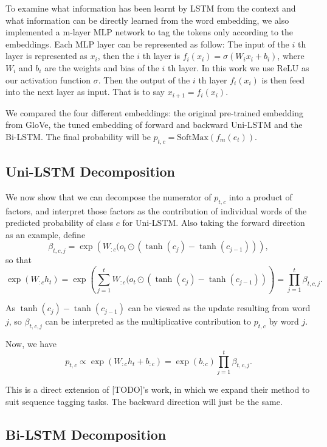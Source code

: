 \documentclass{article}
\begin{document}
To examine what information has been learnt by LSTM from the context and what information can be directly learned from the word embedding, we also implemented a m-layer MLP network to tag the tokens only according to the embeddings. Each MLP layer can be represented as follow:
The input of the $i$ th layer is represented as $x_i$, then the $i$ th layer is $f_i(x_i) = \sigma(W_i x_i + b_i)$, where $W_i$ and $b_i$ are the weights and bias of the $i$ th layer. In this work we use ReLU as our activation function $\sigma$. Then the output of the $i$ th layer $f_i(x_i)$ is then feed into the next layer as input. That is to say $x_{i+1} = f_i(x_i)$. 

We compared the four different embeddings: the original pre-trained embedding from GloVe, the tuned embedding of forward and backward Uni-LSTM and the Bi-LSTM. The final probability will be $p_{t, c} = \text{SoftMax}(f_m(e_t))$.%

\subsection{Uni-LSTM Decomposition}
\label{uni-lstm-decom}

We now show that we can decompose the numerator of $p_{t, c}$ into a product of factors, and interpret those factors as the contribution of individual words of the predicted probability of class $c$ for Uni-LSTM. Also taking the forward direction as an example, define 
\begin{equation}\label{eq:uni-beta} 
\beta_{t, c, j} = \exp\left(W_{:c} (o_t \odot (\tanh(c_j)- \tanh(c_{j-1}))\right),
\end{equation}
so that 
\[\exp( W_{:c} h_t) = \exp\left(\sum_{j=1}^t W_{:c} (o_t \odot (\tanh(c_j) - \tanh(c_{j-1}))\right) = \prod_{j=1}^t \beta_{t, c, j}.\]

As $\tanh(c_j) - \tanh(c_{j-1})$ can be viewed as the update resulting from word $j$, so $\beta_{t, c, j}$ can be interpreted as the multiplicative contribution to $p_{t, c}$ by word $j$. 

Now, we have 
\begin{equation}
p_{t, c} \propto \exp( W_{:c} h_t + b_{:c}) = \exp(b_{:c})\prod_{j=1}^t \beta_{t, c, j}.
\end{equation}

This is a direct extension of [TODO]'s work, in which we expand their method to suit sequence tagging tasks.
The backward direction will just be the same.

\subsection{Bi-LSTM Decomposition}
\label{bi-lstm-decom}
\end{document}
